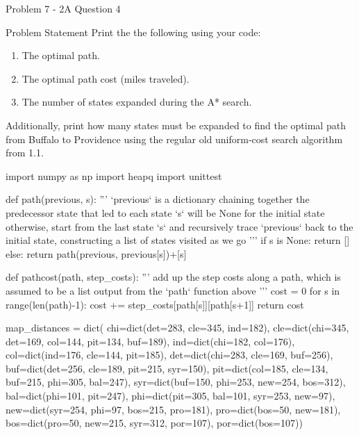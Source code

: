 \begin{problem}{Problem 7 - 2A Question 4}
    \begin{statement}{Problem Statement}
        Print the the following using your code:

        \begin{enumerate}
            \item The optimal path.
            \item The optimal path cost (miles traveled).
            \item The number of states expanded during the A* search.
        \end{enumerate}

        Additionally, print how many states must be expanded to find the optimal path from Buffalo to Providence using the regular old uniform-cost search algorithm from 1.1.
    \end{statement}

    \begin{highlight}[Solution]
    \begin{code}[Python]
    import numpy as np
    import heapq
    import unittest
    
    def path(previous, s): 
        '''
        `previous` is a dictionary chaining together the predecessor state that led to each state
        `s` will be None for the initial state
        otherwise, start from the last state `s` and recursively trace `previous` back to the initial state,
        constructing a list of states visited as we go
        '''
        if s is None:
            return []
        else:
            return path(previous, previous[s])+[s]
    
    def pathcost(path, step_costs):
        '''
        add up the step costs along a path, which is assumed to be a list output from the `path` function above
        '''
        cost = 0
        for s in range(len(path)-1):
            cost += step_costs[path[s]][path[s+1]]
        return cost
    
    map_distances = dict(
        chi=dict(det=283, cle=345, ind=182),
        cle=dict(chi=345, det=169, col=144, pit=134, buf=189),
        ind=dict(chi=182, col=176),
        col=dict(ind=176, cle=144, pit=185),
        det=dict(chi=283, cle=169, buf=256),
        buf=dict(det=256, cle=189, pit=215, syr=150),
        pit=dict(col=185, cle=134, buf=215, phi=305, bal=247),
        syr=dict(buf=150, phi=253, new=254, bos=312),
        bal=dict(phi=101, pit=247),
        phi=dict(pit=305, bal=101, syr=253, new=97),
        new=dict(syr=254, phi=97, bos=215, pro=181),
        pro=dict(bos=50, new=181),
        bos=dict(pro=50, new=215, syr=312, por=107),
        por=dict(bos=107))
    

\end{code}
\end{highlight}
\end{problem}
